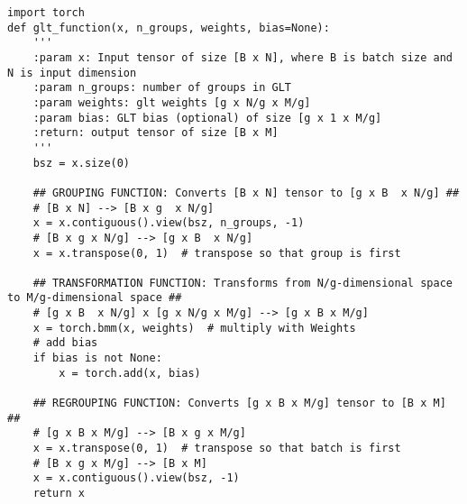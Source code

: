 


\begin{minipage}{\columnwidth}
\begin{lstlisting}[caption="Naive implementation of GLT in Pytorch", label={lst:navie_glt}]
import torch
def glt_function(x, n_groups, weights, bias=None):
    '''
    :param x: Input tensor of size [B x N], where B is batch size and N is input dimension
    :param n_groups: number of groups in GLT
    :param weights: glt weights [g x N/g x M/g]
    :param bias: GLT bias (optional) of size [g x 1 x M/g]
    :return: output tensor of size [B x M]
    '''
    bsz = x.size(0)
    
    ## GROUPING FUNCTION: Converts [B x N] tensor to [g x B  x N/g] ##
    # [B x N] --> [B x g  x N/g]
    x = x.contiguous().view(bsz, n_groups, -1)
    # [B x g x N/g] --> [g x B  x N/g]
    x = x.transpose(0, 1)  # transpose so that group is first

    ## TRANSFORMATION FUNCTION: Transforms from N/g-dimensional space to M/g-dimensional space ##
    # [g x B  x N/g] x [g x N/g x M/g] --> [g x B x M/g]
    x = torch.bmm(x, weights)  # multiply with Weights
    # add bias
    if bias is not None:
        x = torch.add(x, bias)
        
    ## REGROUPING FUNCTION: Converts [g x B x M/g] tensor to [B x M] ##
    # [g x B x M/g] --> [B x g x M/g]
    x = x.transpose(0, 1)  # transpose so that batch is first
    # [B x g x M/g] --> [B x M]
    x = x.contiguous().view(bsz, -1)
    return x
\end{lstlisting}
\end{minipage}


